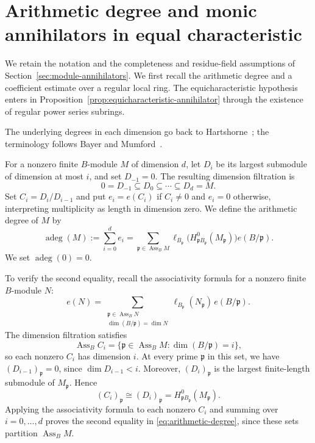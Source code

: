 \documentclass[11pt,reqno]{amsart}
\numberwithin{equation}{section}
\theoremstyle{definition}
\newcommand{\adeg}{\operatorname{adeg}}
\newcommand{\Ass}{\operatorname{Ass}}
\begin{document}
\section{Arithmetic degree and monic annihilators in equal characteristic}
\label{sec:equicharacteristic-annihilators}

We retain the notation and the completeness and residue-field
assumptions of Section~\ref{sec:module-annihilators}. We first recall
the arithmetic degree and a coefficient estimate over a regular local
ring. The equicharacteristic hypothesis enters in
Proposition~\ref{prop:equicharacteristic-annihilator} through the
existence of regular power series subrings.

The underlying degrees in each dimension go back to
Hartshorne~\cite[Chapter~2]{Hartshorne1966}; the terminology follows
Bayer and Mumford~\cite[Section~3]{BayerMumford1993}.

For a nonzero finite $B$-module $M$ of dimension $d$, let
$D_i$ be its largest submodule of dimension at most $i$, and set
$D_{-1}=0$. The resulting dimension filtration is
\[
 0=D_{-1}\subseteq D_0\subseteq\cdots\subseteq D_d=M.
\]
Set $C_i=D_i/D_{i-1}$ and put $e_i=e(C_i)$ if $C_i\ne0$ and
$e_i=0$ otherwise, interpreting multiplicity as length in dimension
zero. We define the arithmetic degree of $M$ by
\begin{equation}\label{eq:arithmetic-degree}
 \adeg(M):=\sum_{i=0}^d e_i
 =\sum_{\mathfrak p\in\Ass_B M}
   \ell_{B_{\mathfrak p}}
     \bigl(H^0_{\mathfrak pB_{\mathfrak p}}(M_{\mathfrak p})\bigr)
     e(B/\mathfrak p).
\end{equation}
We set $\adeg(0)=0$.

To verify the second equality, recall the associativity formula
for a nonzero finite $B$-module $N$:
\[
 e(N)=
 \sum_{\substack{\mathfrak p\in\Ass_B N\\
                  \dim(B/\mathfrak p)=\dim N}}
 \ell_{B_{\mathfrak p}}(N_{\mathfrak p})\,e(B/\mathfrak p).
\]
The dimension filtration satisfies
\[
 \Ass_B C_i
 =\{\mathfrak p\in\Ass_B M:\dim(B/\mathfrak p)=i\},
\]
so each nonzero $C_i$ has dimension $i$.
At every prime $\mathfrak p$ in this set, we have
$(D_{i-1})_{\mathfrak p}=0$, since $\dim D_{i-1}<i$.
Moreover, $(D_i)_{\mathfrak p}$ is the largest finite-length
submodule of $M_{\mathfrak p}$. Hence
\[
 (C_i)_{\mathfrak p}\cong(D_i)_{\mathfrak p}
 =H^0_{\mathfrak pB_{\mathfrak p}}(M_{\mathfrak p}).
\]
Applying the associativity formula to each nonzero $C_i$ and
summing over $i=0,\ldots,d$ proves the second equality in
\eqref{eq:arithmetic-degree}, since these sets partition $\Ass_B M$.
\end{document}
